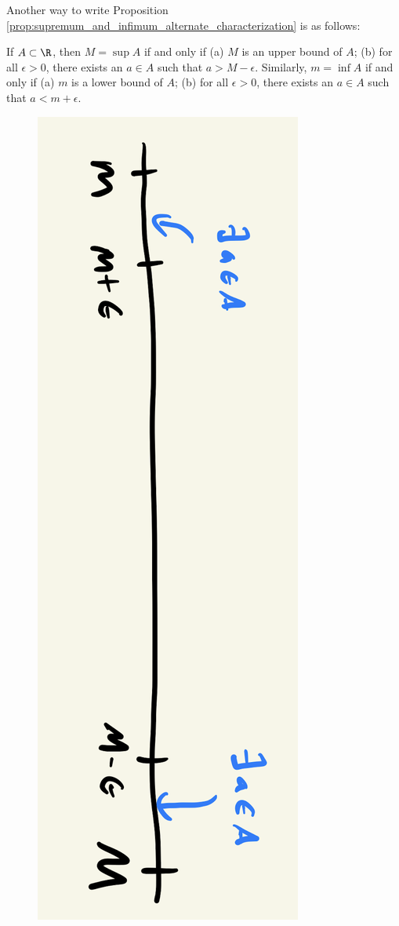 \documentclass{article} %
\begin{document}
\begin{remark}
Another way to write Proposition \ref{prop:supremum_and_infimum_alternate_characterization} is as follows:	

If $A \subset \R$, then $M = \sup A$ if and only if (a) $M$ is an upper bound of $A$; (b) for all $\epsilon >0$, there exists an $a \in A$ such that $a>M-\epsilon$.  Similarly, $m = \inf A$ if and only if (a) $m$ is a lower bound of $A$; (b) for all $\epsilon >0$, there exists an $a \in A$ such that $a<m+\epsilon$.

\begin{figure}[H]
\centering
\includegraphics[angle=90, width=.5\textwidth]{images/infimum_and_supremum}
\end{figure}
\label{rk:usage_of_alternate_characterization_of_inf_and_sup}
\end{remark}
\end{document}
